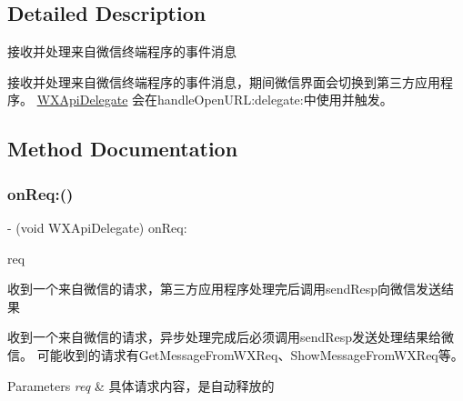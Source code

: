 \subsection{Detailed Description}
接收并处理来自微信终端程序的事件消息 

接收并处理来自微信终端程序的事件消息，期间微信界面会切换到第三方应用程序。 \mbox{\hyperlink{class_w_x_api_delegate-p}{W\+X\+Api\+Delegate}} 会在handle\+Open\+U\+R\+L\+:delegate\+:中使用并触发。 

\subsection{Method Documentation}
\mbox{\label{protocol_w_x_api_delegate_01-p_a185c8b9b51ff2398667dbf8cedffc8d6}} 
\subsubsection{\texorpdfstring{on\+Req\+:()}{onReq:()}\hspace{0.1cm}{\footnotesize\ttfamily [1/3]}}
{\footnotesize\ttfamily -\/ (void W\+X\+Api\+Delegate) on\+Req\+: \begin{DoxyParamCaption}\item[{(\mbox{\hyperlink{interface_base_req}{Base\+Req}} $\ast$)}]{req }\end{DoxyParamCaption}\hspace{0.3cm}{\ttfamily [optional]}}



收到一个来自微信的请求，第三方应用程序处理完后调用send\+Resp向微信发送结果 

收到一个来自微信的请求，异步处理完成后必须调用send\+Resp发送处理结果给微信。 可能收到的请求有\+Get\+Message\+From\+W\+X\+Req、\+Show\+Message\+From\+W\+X\+Req等。 
\begin{DoxyParams}{Parameters}
{\em req} & 具体请求内容，是自动释放的 \\
\hline
\end{DoxyParams}
\mbox{\label{protocol_w_x_api_delegate_01-p_a185c8b9b51ff2398667dbf8cedffc8d6}} 
